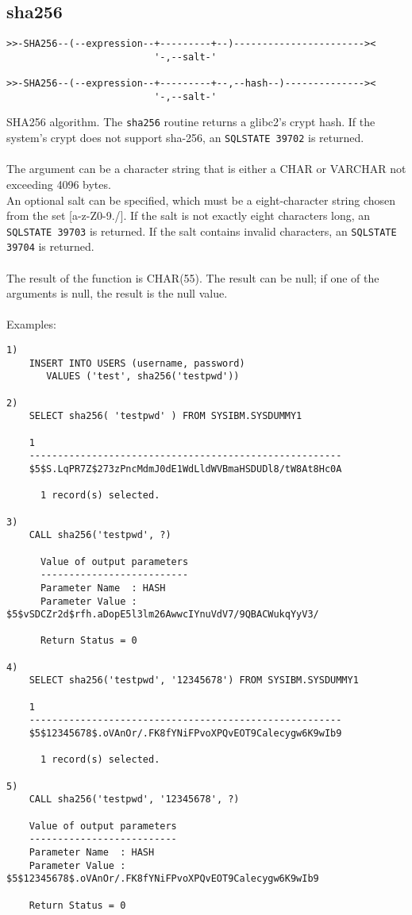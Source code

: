 \subsection{sha256} \label{sha256}
\begin{verbatim}
>>-SHA256--(--expression--+---------+--)-----------------------><
                          '-,--salt-'

>>-SHA256--(--expression--+---------+--,--hash--)--------------><
                          '-,--salt-'
\end{verbatim}
SHA256 algorithm. The {\tt sha256} routine returns a glibc2's crypt hash. If the system's crypt does not support sha-256, an \mbox{{\tt SQLSTATE 39702}} is returned.\\
\\
The argument can be a character string that is either a \mbox{CHAR} or \mbox{VARCHAR} not exceeding 4096 bytes.\\
An optional salt can be specified, which must be a eight-character string chosen from the set [a-z-Z0-9./]. If the salt is not exactly eight characters long, an \mbox{{\tt SQLSTATE 39703}} is returned. If the salt contains invalid characters, an \mbox{{\tt SQLSTATE 39704}} is returned.\\
\\
The result of the function is CHAR(55). The result can be null; if one of the arguments is null, the result is the null value.\\
\\
Examples:
\begin{verbatim}
1)
    INSERT INTO USERS (username, password)
       VALUES ('test', sha256('testpwd'))

2)
    SELECT sha256( 'testpwd' ) FROM SYSIBM.SYSDUMMY1

    1
    -------------------------------------------------------
    $5$S.LqPR7Z$273zPncMdmJ0dE1WdLldWVBmaHSDUDl8/tW8At8Hc0A

      1 record(s) selected.

3)
    CALL sha256('testpwd', ?)

      Value of output parameters
      --------------------------
      Parameter Name  : HASH
      Parameter Value : $5$vSDCZr2d$rfh.aDopE5l3lm26AwwcIYnuVdV7/9QBACWukqYyV3/

      Return Status = 0

4)
    SELECT sha256('testpwd', '12345678') FROM SYSIBM.SYSDUMMY1

    1
    -------------------------------------------------------
    $5$12345678$.oVAnOr/.FK8fYNiFPvoXPQvEOT9Calecygw6K9wIb9

      1 record(s) selected.

5)
    CALL sha256('testpwd', '12345678', ?)

    Value of output parameters
    --------------------------
    Parameter Name  : HASH
    Parameter Value : $5$12345678$.oVAnOr/.FK8fYNiFPvoXPQvEOT9Calecygw6K9wIb9

    Return Status = 0
\end{verbatim}
\newpage
\hypertarget{hsha512}{}
